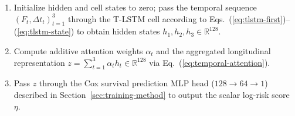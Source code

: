 \begin{algorithm}[H]
\begin{enumerate}[leftmargin=1.2em,label=\arabic*.,itemsep=0.2em]
\begin{enumerate}[leftmargin=1.2em,label=\alph*.,itemsep=0.15em]
\end{enumerate}
\item Initialize hidden and cell states to zero; pass the temporal sequence $(F_t,\Delta t_t)_{t=1}^3$ through the T-LSTM cell according to Eqs.~(\ref{eq:tlstm-first})--(\ref{eq:tlstm-state}) to obtain hidden states $h_1,h_2,h_3\in\mathbb R^{128}$.
\item Compute additive attention weights $\alpha_t$ and the aggregated longitudinal representation $z=\sum_{t=1}^3\alpha_t h_t\in\mathbb R^{128}$ via Eq.~(\ref{eq:temporal-attention}).
\item Pass $z$ through the Cox survival prediction MLP head ($128\to64\to1$) described in Section~\ref{sec:training-method} to output the scalar log-risk score $\eta$.
\end{enumerate}
\end{algorithm}
